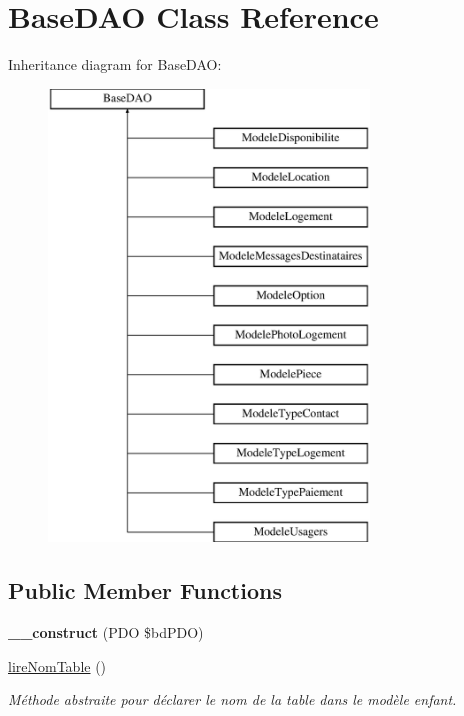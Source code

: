 \hypertarget{class_base_d_a_o}{}\section{Base\+D\+AO Class Reference}
\label{class_base_d_a_o}
Inheritance diagram for Base\+D\+AO\+:\begin{figure}[H]
\begin{center}
\leavevmode
\includegraphics[height=12.000000cm]{class_base_d_a_o}
\end{center}
\end{figure}
\subsection*{Public Member Functions}
\begin{DoxyCompactItemize}
\item 
\mbox{\label{class_base_d_a_o_ad24935f24683137fa706c8db44e36545}} 
{\bfseries \+\_\+\+\_\+construct} (P\+DO \$bd\+P\+DO)
\item 
\mbox{\label{class_base_d_a_o_a3046f62d7a52c8eddd7791f0630fde85}} 
\hyperlink{class_base_d_a_o_a3046f62d7a52c8eddd7791f0630fde85}{lire\+Nom\+Table} ()
\begin{DoxyCompactList}\small\item\em Méthode abstraite pour déclarer le nom de la table dans le modèle enfant. \end{DoxyCompactList}\end{DoxyCompactItemize}
